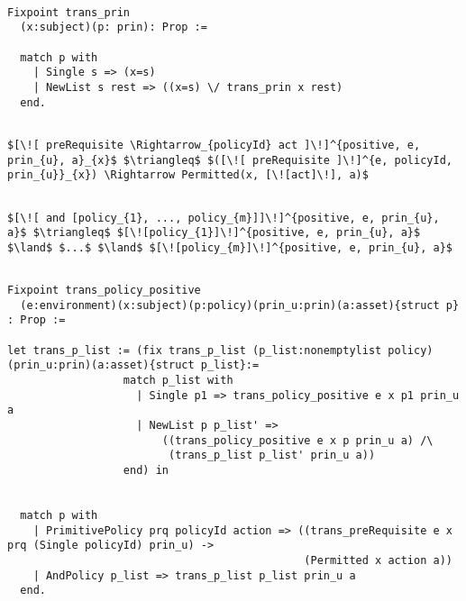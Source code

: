 \begin{lstlisting}

Fixpoint trans_prin
  (x:subject)(p: prin): Prop :=

  match p with
    | Single s => (x=s)
    | NewList s rest => ((x=s) \/ trans_prin x rest)
  end.
\end{lstlisting}

\lstset{mathescape, language=AST}  
\begin{lstlisting}[frame=single, caption={Positive Policy Translation {$\colon$} Single policy},label={lst:transpolicypositiveSingle}]

$[\![ preRequisite \Rightarrow_{policyId} act ]\!]^{positive, e, prin_{u}, a}_{x}$ $\triangleq$ $([\![ preRequisite ]\!]^{e, policyId, prin_{u}}_{x}) \Rightarrow Permitted(x, [\![act]\!], a)$

\end{lstlisting}



\lstset{mathescape, language=AST}  
\begin{lstlisting}[frame=single, caption={Positive Policy Translation {$\colon$} List of policies},label={lst:transpolicypositiveListOfPolicies}]

$[\![ and [policy_{1}, ..., policy_{m}]]\!]^{positive, e, prin_{u}, a}$ $\triangleq$ $[\![policy_{1}]\!]^{positive, e, prin_{u}, a}$ $\land$ $...$ $\land$ $[\![policy_{m}]\!]^{positive, e, prin_{u}, a}$

\end{lstlisting}



\begin{lstlisting}

Fixpoint trans_policy_positive
  (e:environment)(x:subject)(p:policy)(prin_u:prin)(a:asset){struct p} : Prop :=

let trans_p_list := (fix trans_p_list (p_list:nonemptylist policy)(prin_u:prin)(a:asset){struct p_list}:=
                  match p_list with
                    | Single p1 => trans_policy_positive e x p1 prin_u a
                    | NewList p p_list' => 
                        ((trans_policy_positive e x p prin_u a) /\ 
                         (trans_p_list p_list' prin_u a))
                  end) in


  match p with
    | PrimitivePolicy prq policyId action => ((trans_preRequisite e x prq (Single policyId) prin_u) ->
                                              (Permitted x action a))
    | AndPolicy p_list => trans_p_list p_list prin_u a
  end.
\end{lstlisting}







